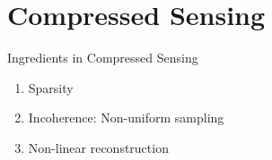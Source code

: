 \documentclass[aspectratio=169]{beamer}
\begin{document}
	\section{Compressed Sensing}
	
	\begin{frame}{Ingredients in Compressed Sensing}
		
		\begin{enumerate}
			\item Sparsity
			
			\vspace{1em}
			
			\item Incoherence: Non-uniform sampling
			
			\vspace{1em}
			
			\item Non-linear reconstruction
			
		\end{enumerate}
		
	\end{frame}
	
\end{document}
